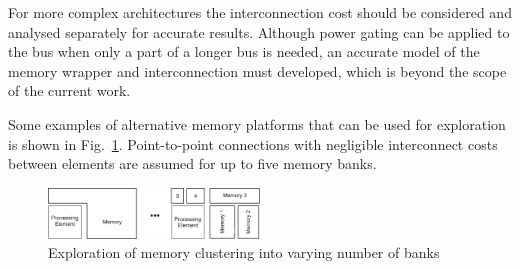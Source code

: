 \documentclass[a4paper,conference]{IEEEtran}
\begin{document}
For more complex architectures the interconnection cost should be considered and analysed separately for accurate results. Although power gating can be applied to the bus when only a part of a longer bus is needed, an accurate model of the memory wrapper and interconnection must developed, which is beyond the scope of the current work. 

Some examples of alternative memory platforms that can be used for exploration is shown in Fig.~\ref{fig:platform}. Point-to-point connections with negligible interconnect costs between elements are assumed for up to five memory banks.

\begin{figure}[!t]
\centering
\includegraphics[width=0.50\textwidth]{Images/platform.eps}
\caption{Exploration of memory clustering into varying number of banks}
\label{fig:platform}
\end{figure}
\end{document}
